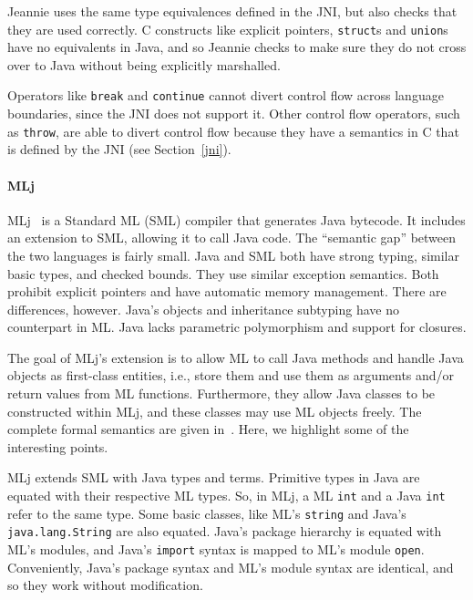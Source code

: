 Jeannie uses the same type equivalences defined in the JNI, but also checks that they are used correctly. C constructs like explicit pointers, \texttt{struct}s and \texttt{union}s have no equivalents in Java, and so Jeannie checks to make sure they do not cross over to Java without being explicitly marshalled.

Operators like \texttt{break} and \texttt{continue} cannot divert control flow across language boundaries, since the JNI does not support it. Other control flow operators, such as \texttt{throw}, are able to divert control flow because they have a semantics in C that is defined by the JNI (see Section~\ref{jni}).


\paragraph{MLj}

MLj~\cite{benton99interlang} is a Standard ML (SML) compiler that generates Java bytecode. It includes an extension to SML, allowing it to call Java code. The ``semantic gap'' between the two languages is fairly small. Java and SML both have strong typing, similar basic types, and checked bounds. They use similar exception semantics. Both prohibit explicit pointers and have automatic memory management. There are differences, however. Java's objects and inheritance subtyping have no counterpart in ML. Java lacks parametric polymorphism and support for closures.


The goal of MLj's extension is to allow ML to call Java methods and handle Java objects as first-class entities, i.e., store them and use them as arguments and/or return values from ML functions. Furthermore, they allow Java classes to be constructed within MLj, and these classes may use ML objects freely. The complete formal semantics are given in~\cite{benton99interlang}. Here, we highlight some of the interesting points.

MLj extends SML with Java types and terms. Primitive types in Java are equated with their respective ML types. So, in MLj, a ML \texttt{int} and a Java \texttt{int} refer to the same type. Some basic classes, like ML's \texttt{string} and Java's \texttt{java.lang.String} are also equated. Java's package hierarchy is equated with ML's modules, and Java's \texttt{import} syntax is mapped to ML's module \texttt{open}. Conveniently, Java's package syntax and ML's module syntax are identical, and so they work without modification.

